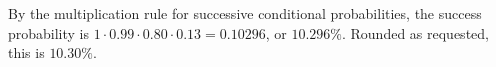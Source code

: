 By the multiplication rule for successive conditional probabilities, the success probability is $1\cdot0.99\cdot0.80\cdot0.13=0.10296$, or $10.296\%$. Rounded as requested, this is $\boxed{10.30\%}$.
